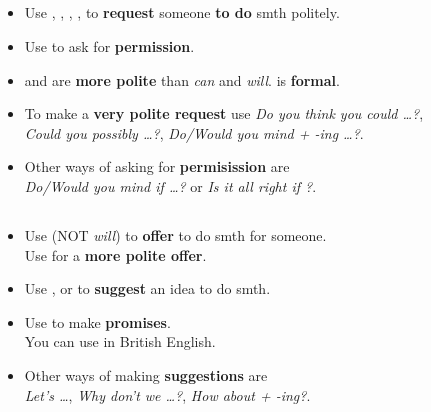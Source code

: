 \subsection{}
\begin{itemize}
    \item Use , , , ,
    to \textbf{request} someone \textbf{to do} smth politely.
    \item[\doot] Use  to ask for \textbf{permission}.
    \item {} and  are \textbf{more polite}
    than \textit{can} and \textit{will}.  is \textbf{formal}.
    \item[\doot] To make a \textbf{very polite request} use \textit{Do you think you could \ldots{}?},\\
    \textit{Could you possibly \ldots{}?}, \textit{Do/Would you mind + -ing \ldots{}?}.
    \item[\doot] Other ways of asking for \textbf{permisission} are\\
    \textit{Do/Would you mind if \ldots{}?} or \textit{Is it all right if \ldost{}?}.
\end{itemize}

\subsection{}
\begin{itemize}
    \item[\doot] Use  (NOT \textit{will}) to \textbf{offer} to do smth for someone.\\
    Use  for a \textbf{more polite offer}.
    \item[\doot] Use ,  or  to \textbf{suggest} an idea to do smth.
    \item[\doot] Use  to make \textbf{promises}.\\
    You can use  in British English.
    \item[\doot] Other ways of making \textbf{suggestions} are\\
    \textit{Let's \ldots{}}, \textit{Why don't we \ldots{}?}, \textit{How about + -ing?}.
\end{itemize}
